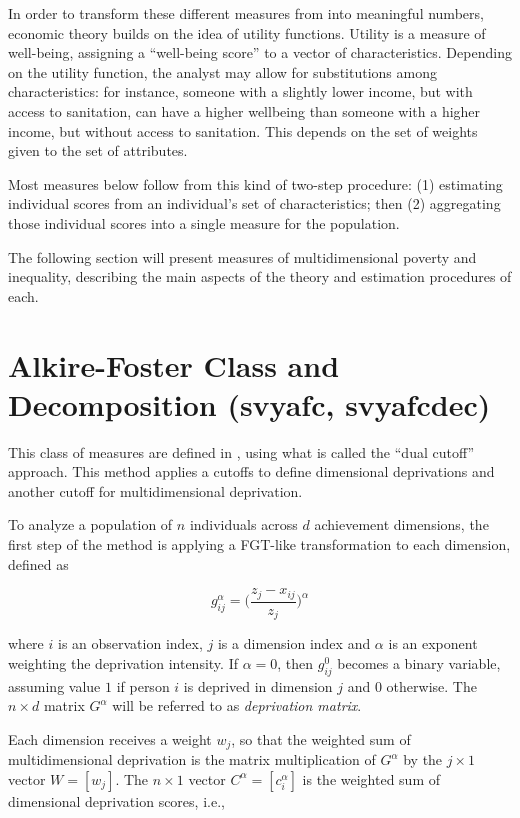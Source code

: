 \documentclass[]{book}
\begin{document}
In order to transform these different measures from into meaningful
numbers, economic theory builds on the idea of utility functions.
Utility is a measure of well-being, assigning a ``well-being score'' to
a vector of characteristics. Depending on the utility function, the
analyst may allow for substitutions among characteristics: for instance,
someone with a slightly lower income, but with access to sanitation, can
have a higher wellbeing than someone with a higher income, but without
access to sanitation. This depends on the set of weights given to the
set of attributes.

Most measures below follow from this kind of two-step procedure: (1)
estimating individual scores from an individual's set of
characteristics; then (2) aggregating those individual scores into a
single measure for the population.

The following section will present measures of multidimensional poverty
and inequality, describing the main aspects of the theory and estimation
procedures of each.

\section{Alkire-Foster Class and Decomposition (svyafc,
svyafcdec)}\label{alkire-foster-class-and-decomposition-svyafc-svyafcdec}

This class of measures are defined in \citet{alkire2011}, using what is
called the ``dual cutoff'' approach. This method applies a cutoffs to
define dimensional deprivations and another cutoff for multidimensional
deprivation.

To analyze a population of \(n\) individuals across \(d\) achievement
dimensions, the first step of the method is applying a FGT-like
transformation to each dimension, defined as

\[
g_{ij}^\alpha = \bigg( \frac{ z_j - x_{ij} }{ z_j } \bigg)^{\alpha}
\]

where \(i\) is an observation index, \(j\) is a dimension index and
\(\alpha\) is an exponent weighting the deprivation intensity. If
\(\alpha=0\), then \(g_{ij}^0\) becomes a binary variable, assuming
value \(1\) if person \(i\) is deprived in dimension \(j\) and \(0\)
otherwise. The \(n \times d\) matrix \(G^\alpha\) will be referred to as
\emph{deprivation matrix}.

Each dimension receives a weight \(w_j\), so that the weighted sum of
multidimensional deprivation is the matrix multiplication of
\(G^\alpha\) by the \(j \times 1\) vector \(W = [w_j]\). The
\(n \times 1\) vector \(C^\alpha = [c^\alpha_i]\) is the weighted sum of
dimensional deprivation scores, i.e.,
\end{document}
